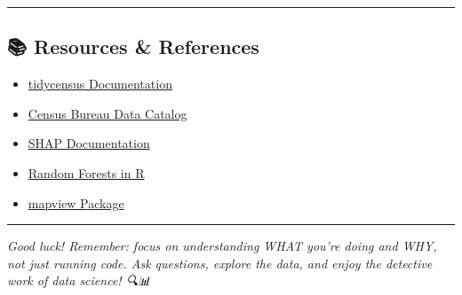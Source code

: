 \documentclass[
  letterpaper,
  DIV=11,
  numbers=noendperiod]{scrartcl}
\providecommand{\tightlist}{%
  \setlength{\itemsep}{0pt}\setlength{\parskip}{0pt}}\usepackage{longtable,booktabs,array}
\begin{document}
\begin{center}\rule{0.5\linewidth}{0.5pt}\end{center}

\subsection{📚 Resources \& References}\label{resources-references}

\begin{itemize}
\tightlist
\item
  \href{https://walker-data.com/tidycensus/}{tidycensus Documentation}
\item
  \href{https://data.census.gov/}{Census Bureau Data Catalog}
\item
  \href{https://shap.readthedocs.io/}{SHAP Documentation}
\item
  \href{https://cran.r-project.org/web/packages/randomForest/randomForest.pdf}{Random
  Forests in R}
\item
  \href{https://r-spatial.github.io/mapview/}{mapview Package}
\end{itemize}

\begin{center}\rule{0.5\linewidth}{0.5pt}\end{center}

\emph{Good luck! Remember: focus on understanding WHAT you're doing and
WHY, not just running code. Ask questions, explore the data, and enjoy
the detective work of data science! 🔍📊}
\end{document}
